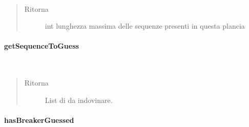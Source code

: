 \documentclass[letterpaper,10pt,italian]{sphinxmanual}
\begin{document}
\begin{fulllineitems}
\label{\detokenize{source/it/unicam/cs/pa/mastermind/gamecore/BoardModel:it.unicam.cs.pa.mastermind.gamecore.BoardModel.getSequenceLength()}}~\begin{quote}\begin{description}
\item[{Ritorna}] \leavevmode
int lunghezza massima delle sequenze presenti in questa plancia

\end{description}\end{quote}

\end{fulllineitems}



\paragraph{getSequenceToGuess}
\label{\detokenize{source/it/unicam/cs/pa/mastermind/gamecore/BoardModel:getsequencetoguess}}

\begin{fulllineitems}
\label{\detokenize{source/it/unicam/cs/pa/mastermind/gamecore/BoardModel:it.unicam.cs.pa.mastermind.gamecore.BoardModel.getSequenceToGuess()}}~\begin{quote}\begin{description}
\item[{Ritorna}] \leavevmode
List di  da indovinare.

\end{description}\end{quote}

\end{fulllineitems}



\paragraph{hasBreakerGuessed}
\label{\detokenize{source/it/unicam/cs/pa/mastermind/gamecore/BoardModel:hasbreakerguessed}}
\end{document}
